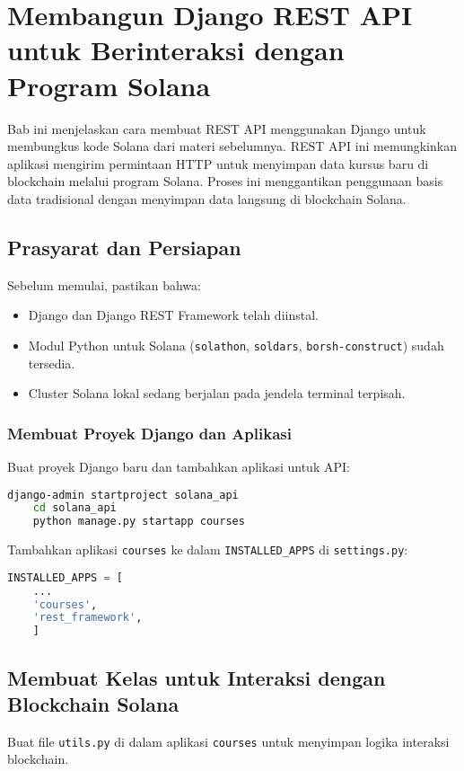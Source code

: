 \chapter{Membangun Django REST API untuk Berinteraksi dengan Program Solana}

Bab ini menjelaskan cara membuat REST API menggunakan Django untuk membungkus kode Solana dari materi sebelumnya. REST API ini memungkinkan aplikasi mengirim permintaan HTTP untuk menyimpan data kursus baru di blockchain melalui program Solana. Proses ini menggantikan penggunaan basis data tradisional dengan menyimpan data langsung di blockchain Solana.

\section{Prasyarat dan Persiapan}
Sebelum memulai, pastikan bahwa:
\begin{itemize}
	\item Django dan Django REST Framework telah diinstal.
	\item Modul Python untuk Solana (\texttt{solathon}, \texttt{soldars}, \texttt{borsh-construct}) sudah tersedia.
	\item Cluster Solana lokal sedang berjalan pada jendela terminal terpisah.
\end{itemize}

\subsection{Membuat Proyek Django dan Aplikasi}
Buat proyek Django baru dan tambahkan aplikasi untuk API:

\begin{lstlisting}[language=bash]
	django-admin startproject solana_api
	cd solana_api
	python manage.py startapp courses
\end{lstlisting}

Tambahkan aplikasi \texttt{courses} ke dalam \texttt{INSTALLED\_APPS} di \texttt{settings.py}:

\begin{lstlisting}[language=python]
	INSTALLED_APPS = [
	...
	'courses',
	'rest_framework',
	]
\end{lstlisting}

\section{Membuat Kelas untuk Interaksi dengan Blockchain Solana}
Buat file \texttt{utils.py} di dalam aplikasi \texttt{courses} untuk menyimpan logika interaksi blockchain.


